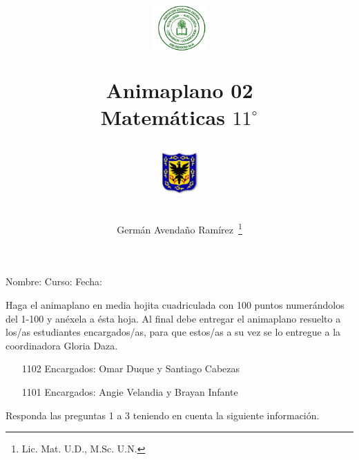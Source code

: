 \documentclass[10pt,twoside]{article}
\author{Germ\'an Avenda\~no Ram\'irez~\thanks{Lic. Mat. U.D., M.Sc. U.N.}}
\title{\begin{minipage}{.2\textwidth}
\includegraphics[height=1.75cm]{Images/logo-colegio.png}\end{minipage}
\begin{minipage}{.55\textwidth}
\begin{center}
Animaplano 02\\
Matemáticas $11^{\circ}$
\end{center}
\end{minipage}\hfill
\begin{minipage}{.2\textwidth}
\includegraphics[height=1.75cm]{Images/logo-sed.png} 
\end{minipage}}
\date{}
\begin{document}
\maketitle
Nombre: \hrulefill Curso: \underline{\hspace*{44pt}} Fecha: \underline{\hspace*{2.5cm}}

\vspace*{10pt}
Haga el animaplano en media hojita cuadriculada con 100 puntos numerándolos del 1-100 y anéxela a ésta hoja. Al final debe entregar el animaplano resuelto a los/as  estudiantes encargados/as, para que estos/as a su vez se lo entregue a la coordinadora Gloria Daza.
\begin{itemize}
 \item[1102] Encargados: Omar Duque y Santiago Cabezas
 \item[1101] Encargados: Angie Velandia y Brayan Infante 
\end{itemize}
 Responda las preguntas 1 a 3 teniendo en cuenta la siguiente información.
\end{document}

